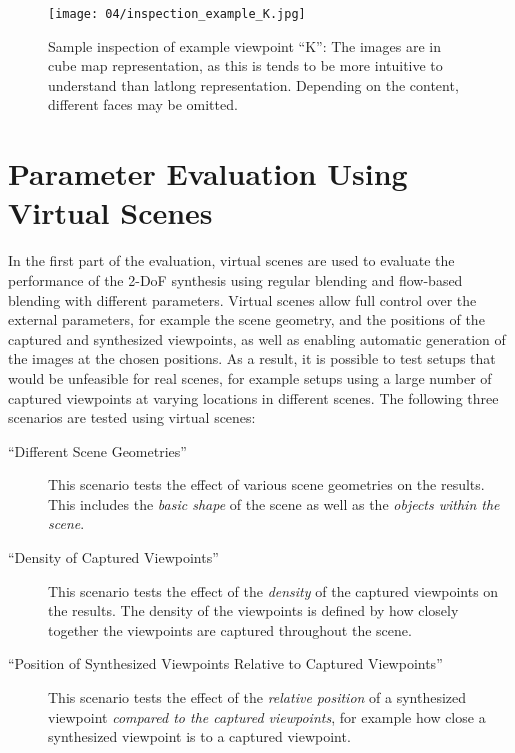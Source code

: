 \begin{figure}
		\centering
		\texttt{[image: 04/inspection\_example\_K.jpg]}
		\caption[Sample inspection of viewpoint ``K'']{Sample inspection of example viewpoint ``K'': The images are in cube map representation, as this is tends to be more intuitive to understand than latlong representation. Depending on the content, different faces may be omitted.}
		\label{fig:inspection_example}
\end{figure}
















\section{Parameter Evaluation Using Virtual Scenes} \label{sec:limit_eval}
In the first part of the evaluation, virtual scenes are used to evaluate the performance of the 2-DoF synthesis using regular blending and flow-based blending with different parameters.
Virtual scenes allow full control over the external parameters, for example the scene geometry, and the positions of the captured and synthesized viewpoints, as well as enabling automatic generation of the images at the chosen positions.
As a result, it is possible to test setups that would be unfeasible for real scenes, for example setups using a large number of captured viewpoints at varying locations in different scenes.
The following three scenarios are tested using virtual scenes:
\begin{description}
\item [``Different Scene Geometries''] This scenario tests the effect of various scene geometries on the results. This includes the \emph{basic shape} of the scene as well as the \emph{objects within the scene}.
\item [``Density of Captured Viewpoints''] This scenario tests the effect of the \emph{density} of the captured viewpoints on the results. The density of the viewpoints is defined by how closely together the viewpoints are captured throughout the scene.
\item [``Position of Synthesized Viewpoints Relative to Captured Viewpoints''] This scenario tests the effect of the \emph{relative position} of a synthesized viewpoint \emph{compared to the captured viewpoints}, for example how close a synthesized viewpoint is to a captured viewpoint.
\end{description}

